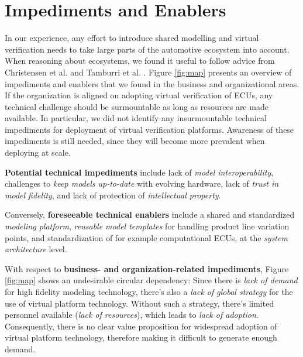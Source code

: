 \section{Impediments and Enablers}\label{sec:impediments_and_enablers}
In our experience, any effort to introduce shared modelling and virtual verification needs to take large parts of the automotive ecosystem into account. 
When reasoning about ecosystems, we found it useful to follow advice from Christensen et al. and Tamburri et al.  \cite{christensen2014analysis,tamburri2013uncovering}. 
Figure \ref{fig:map}  presents an overview of impediments and enablers that we found in the business and organizational areas.
If the organization is aligned on adopting virtual verification of ECUs,
any technical challenge should be surmountable as long as resources are made available.
In particular, we did not identify any insurmountable technical impediments for deployment of virtual verification platforms.
Awareness of these impediments is still needed, since they will become more prevalent when deploying at scale.

\textbf{Potential technical impediments} include
lack of \emph{model interoperability},
challenges to \emph{keep models up-to-date} with evolving hardware,
lack of \emph{trust in model fidelity},
and lack of protection of \emph{intellectual property}.

Conversely, \textbf{foreseeable technical enablers} include a shared and standardized \emph{modeling platform},
\emph{reusable model templates} for handling product line variation points,
and standardization of for example computational ECUs, at the \emph{system architecture} level.



With respect to \textbf{business- and organization-related impediments}, Figure \ref{fig:map} shows an undesirable circular dependency:
Since there is \emph{lack of demand} for high fidelity modeling technology,
there's also a \emph{lack of global strategy} for the use of virtual platform technology.
Without such a strategy, there's limited personnel available (\emph{lack of resources}),
which leads to \emph{lack of adoption}.
Consequently, there is no clear value proposition for widespread adoption of virtual platform technology, therefore making it difficult to generate enough demand.

